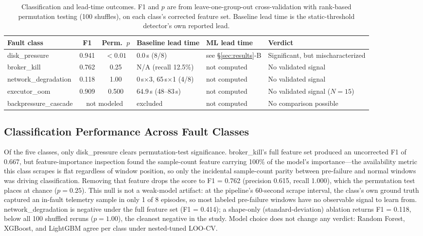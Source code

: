 \documentclass[conference]{IEEEtran}
\newcommand{\bk}{broker\_kill}
\newcommand{\eo}{executor\_oom}
\newcommand{\dpr}{disk\_pressure}
\newcommand{\nd}{network\_degradation}
\newcommand{\bc}{backpressure\_cascade}
\begin{document}
\begin{table}[!t]
\caption{Classification and lead-time outcomes. F1 and $p$ are from leave-one-group-out cross-validation with rank-based permutation testing (100 shuffles), on each class's corrected feature set. Baseline lead time is the static-threshold detector's own reported lead.}
\label{tab:results}
\centering
\footnotesize
\begin{tabular}{@{}lcclll@{}}
\toprule
\textbf{Fault class} & \textbf{F1} & \textbf{Perm.\ $p$} & \textbf{Baseline lead time} & \textbf{ML lead time} & \textbf{Verdict} \\
\midrule
\dpr{} & 0.941 & $<0.01$ & 0.0\,s (8/8)                       & see \S\ref{sec:results}-B & Significant, but mischaracterized \\
\bk{}  & 0.762 & 0.25    & N/A (recall 12.5\%)               & not computed              & No validated signal \\
\nd{}  & 0.118 & 1.00    & 0\,s$\times$3, 65\,s$\times$1 (4/8) & not computed             & No validated signal \\
\eo{}  & 0.909 & 0.500   & 64.9\,s (48--83\,s)               & not computed              & No validated signal ($N{=}15$) \\
\bc{}  & \multicolumn{2}{c}{not modeled} & excluded                & not computed              & No comparison possible \\
\bottomrule
\end{tabular}
\end{table}

\subsection{Classification Performance Across Fault Classes}
Of the five classes, only \dpr{} clears permutation-test significance. \bk{}'s full feature set produced an uncorrected F1 of 0.667, but feature-importance inspection found the sample-count feature carrying 100\% of the model's importance---the availability metric this class scrapes is flat regardless of window position, so only the incidental sample-count parity between pre-failure and normal windows was driving classification. Removing that feature drops the score to F1 = 0.762 (precision 0.615, recall 1.000), which the permutation test places at chance ($p = 0.25$). This null is not a weak-model artifact: at the pipeline's 60-second scrape interval, the class's own ground truth captured an in-fault telemetry sample in only 1 of 8 episodes, so most labeled pre-failure windows have no observable signal to learn from. \nd{} is negative under the full feature set (F1 = 0.414); a shape-only (standard-deviation) ablation returns F1 = 0.118, below all 100 shuffled reruns ($p = 1.00$), the cleanest negative in the study. Model choice does not change any verdict: Random Forest, XGBoost, and LightGBM agree per class under nested-tuned LOO-CV.
\end{document}
